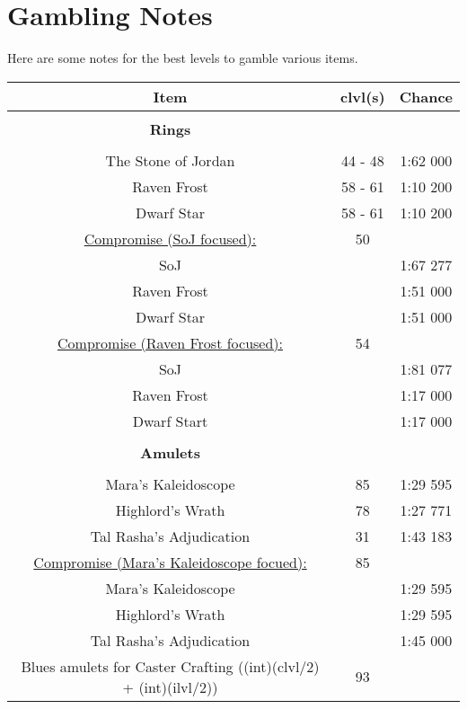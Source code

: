 \chapter{Gambling Notes}\label{label:GamblingNotes}

Here are some notes for the best levels to gamble various items.\cite{maxrollDropcalc}

\begin{center}
	\begin{tabular}{|c|c|c|}
	\hline
	\textbf{Item} & \textbf{clvl(s)} & \textbf{Chance} \\
	\hline

	& & \\
	\textbf{Rings} & & \\
	& & \\

	\hline
	The Stone of Jordan & 44 - 48 & 1:62 000 \\
	\hline
	Raven Frost & 58 - 61 & 1:10 200 \\
	\hline
	Dwarf Star & 58 - 61 & 1:10 200 \\
	\hline
	\underline{Compromise (SoJ focused):} & 50 &  \\
	SoJ & & 1:67 277 \\
	Raven Frost & & 1:51 000 \\
	Dwarf Star & & 1:51 000 \\
	\hline
	\underline{Compromise (Raven Frost focused):} & 54 & \\
	SoJ & & 1:81 077 \\
	Raven Frost & & 1:17 000 \\
	Dwarf Start & & 1:17 000 \\
	\hline

	& & \\
	\textbf{Amulets} & & \\
	& & \\

	\hline
	Mara's Kaleidoscope & 85 & 1:29 595 \\
	\hline
	Highlord's Wrath & 78 & 1:27 771 \\
	\hline
	Tal Rasha's Adjudication & 31 & 1:43 183 \\
	\hline
	\underline{Compromise (Mara's Kaleidoscope focued):} & 85 & \\
	Mara's Kaleidoscope & & 1:29 595 \\
	Highlord's Wrath & & 1:29 595 \\
	Tal Rasha's Adjudication & & 1:45 000 \\
	\hline
	Blues amulets for Caster Crafting ((int)(clvl/2) + (int)(ilvl/2)) & 93 & \\
	\hline


\end{tabular}
\end{center}

